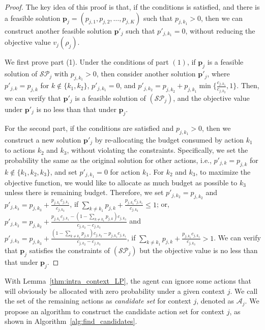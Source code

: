 \begin{proof}
The key idea of this proof is that, if the conditions is satisfied, and there is a feasible solution $\boldsymbol{p}_j = (p_{j,1}, p_{j,2}, \ldots, p_{j,K})$ such that $p_{j,k_1} > 0$, then we can construct another feasible solution $\boldsymbol{p}'_j$ such that $p'_{j,k_1} = 0$, without reducing the objective value $v_j(\rho_j)$.

We first prove part (1). Under the conditions of part $(1)$, if $\boldsymbol{p}_j$ is a feasible solution of $\mathcal{SP}_j$ with $p_{j,k_1} > 0$, then consider another solution $\boldsymbol{p}'_j$, where $p'_{j,k} = p_{j,k}$ for $k \notin \{k_1, k_2\}$, $p'_{j, k_1} = 0$, and $p'_{j, k_2} = p_{j,k_2} + p_{j,k_1} \min\{\frac{c_{j,k_1}}{c_{j,k_2}}, 1\}$. Then, we can verify that $\boldsymbol{p}'_j$ is a feasible solution of $(\mathcal{SP}_j)$, and the objective value under $\boldsymbol{p}'_j$ is no less than that under $\boldsymbol{p}_j$.

For the second part, if the conditions are satisfied and $p_{j,k_1} > 0$, then we construct a new solution $\boldsymbol{p}'_j$ by re-allocating the budget consumed by action $k_1$ to actions $k_2$ and $k_3$, without violating the constraints. Specifically, we set the probability the same as the original solution for other actions, i.e., $p'_{j,k} = p_{j,k}$ for $k \notin \{k_1, k_2, k_3\}$, and set $p'_{j,k_1} = 0$ for action $k_1$. For $k_2$ and $k_3$, to maximize the objective function, we would like to allocate as much budget as possible to $k_3$ unless there is remaining budget. Therefore, we set
$p'_{j,k_2} = p_{j,k_2}$ and $p'_{j,k_3} = p_{j,k_3} + \frac{p_{j,k_1}c_{j,k_1}}{c_{j,k_3}}$, if $\sum_{k \neq k_1} p_{j,k} + \frac{p_{j,k_1}c_{j,k_1}}{c_{j,k_3}} \leq 1$; or,
$p'_{j,k_2} = p_{j,k_2} + \frac{p_{j,k_1}c_{j,k_1} - (1 - \sum_{k\neq k_1}p_{j,k})c_{j,k_3}}{c_{j,k_2} - c_{j,k_3}}$ and $p'_{j,k_3} = p_{j,k_3} + \frac{(1 - \sum_{k\neq k_1}p_{j,k})c_{j,k_2} - p_{j,k_1}c_{j,k_1}}{c_{j,k_2} - c_{j,k_3}}$, if $\sum_{k \neq k_1} p_{j,k} + \frac{p_{j,k_1}c_{j,k_1}}{c_{j,k_3}} > 1$. We can verify that $\boldsymbol{p}_j$ satisfies the constraints of $(\mathcal{SP}_j)$ but the objective value is no less than that under $\boldsymbol{p}_j$.
\end{proof}

With Lemma~\ref{thm:intra_context_LP}, the agent can ignore some actions that will obviously be allocated with zero probability under a given context $j$. We call the set of the remaining actions as \emph{candidate set} for context $j$, denoted as $\mathcal{A}_j$. We propose an algorithm to construct the candidate action set for context $j$, as shown in Algorithm~\ref{alg:find_candidates}.

